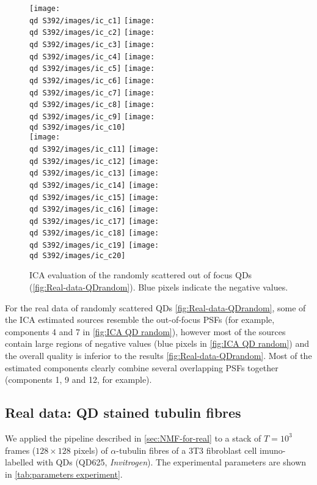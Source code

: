 \begin{figure}[htb]
	\newcommand{\wf}{.25}
	\newcommand{\barspace}{-.6cm}	
	\centering
	\texttt{[image: \\qd S392/images/ic\_c1]}
	\texttt{[image: \\qd S392/images/ic\_c2]}
	\texttt{[image: \\qd S392/images/ic\_c3]}
	\texttt{[image: \\qd S392/images/ic\_c4]}
	\texttt{[image: \\qd S392/images/ic\_c5]}
	\texttt{[image: \\qd S392/images/ic\_c6]}
	\texttt{[image: \\qd S392/images/ic\_c7]}
	\texttt{[image: \\qd S392/images/ic\_c8]}
	\texttt{[image: \\qd S392/images/ic\_c9]}
	\texttt{[image: \\qd S392/images/ic\_c10]}\\
	\texttt{[image: \\qd S392/images/ic\_c11]}
	\texttt{[image: \\qd S392/images/ic\_c12]}
	\texttt{[image: \\qd S392/images/ic\_c13]}
	\texttt{[image: \\qd S392/images/ic\_c14]}
	\texttt{[image: \\qd S392/images/ic\_c15]}
	\texttt{[image: \\qd S392/images/ic\_c16]}
	\texttt{[image: \\qd S392/images/ic\_c17]}
	\texttt{[image: \\qd S392/images/ic\_c18]}
	\texttt{[image: \\qd S392/images/ic\_c19]}
	\texttt{[image: \\qd S392/images/ic\_c20]}
	\caption{ICA evaluation of the randomly scattered out of focus QDs (\autoref{fig:Real-data-QDrandom}). Blue pixels indicate the negative values.}
	\label{fig:ICA QD random}
\end{figure}
%
For the real data of randomly scattered QDs \autoref{fig:Real-data-QDrandom}\aaa, some of the ICA estimated sources resemble the out-of-focus PSFs (for example, components 4 and 7 in \autoref{fig:ICA QD random}), however most of the sources contain large regions of negative values (blue pixels in \autoref{fig:ICA QD random}) and the overall quality is inferior to the \inmf{} results \autoref{fig:Real-data-QDrandom}\bbb. Most of the estimated components clearly combine several overlapping PSFs together (components 1, 9 and 12, for example). 
\clearpage
\subsection{Real data: QD stained tubulin fibres\label{sub:results - tubulin}}
We applied the pipeline described in \autoref{sec:NMF-for-real} to a stack of $T=10^{3}$ frames ($128\times128$ pixels) of $\alpha$-tubulin fibres of a 3T3 fibroblast cell imuno-labelled with QDs (QD625, \emph{Invitrogen}). The experimental parameters are shown in \autoref{tab:parameters experiment}.

